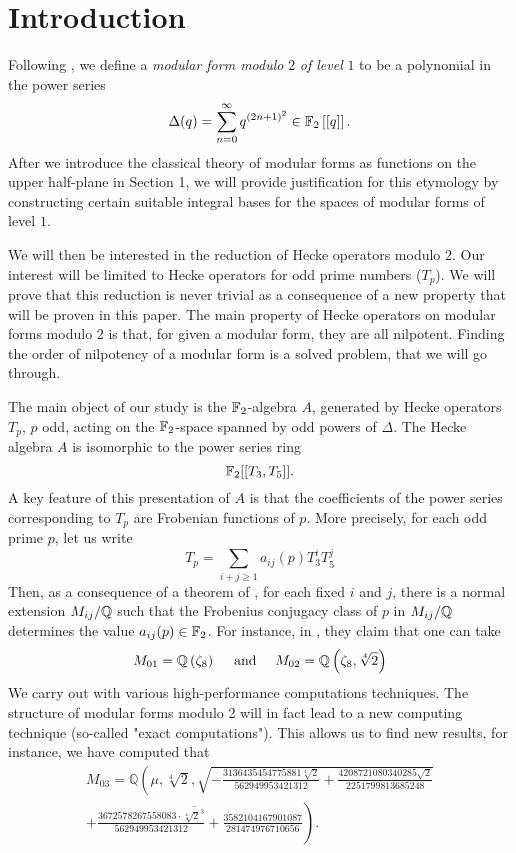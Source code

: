 \setcounter{section}{-1}
\section{Introduction}

Following \cite{OrdreNilpotenceOperateurHecke}, we define a \textit{modular form modulo} $2$ \textit{of level} $1$ to be a polynomial in the power series 
$$
\Delta(q) = \sum_{n = 0}^{\infty}q^{(2n+1)^2} \in \mathbb{F}_2\left[\left[ q \right]\right].
$$
After we introduce the classical theory of modular forms as functions on the upper half-plane in Section 1, we will provide justification for this etymology by constructing certain suitable integral bases for the spaces of modular forms of level $1$.

We will then be interested in the reduction of Hecke operators modulo $2$.
Our interest will be limited to Hecke operators for odd prime numbers ($T_p$).
We will prove that this reduction is never trivial as a consequence of a new property that will be proven in this paper.
The main property of Hecke operators on modular forms modulo $2$ is that, for given a modular form, they are all nilpotent.
Finding the order of nilpotency of a modular form is a solved problem, that we will go through.

The main object of our study is the $\mathbb{F}_2$-algebra $A$, generated by Hecke operators $T_p$, $p$ odd, acting on the $\mathbb{F}_2$-space spanned by odd powers of $\Delta$.
The Hecke algebra $A$ is isomorphic to the power series ring 
$$
\mathbb{F}_2[[T_3, T_5]].
$$
A key feature of this presentation of $A$ is that the coefficients of the power series corresponding to $T_p$ are Frobenian functions of $p$.
More precisely, for each odd prime $p$, let us write 
$$
T_p = \sum_{i+j \geq 1} a_{ij}(p)T_3^iT_5^j
$$
Then, as a consequence of a theorem of \cite{bellaiche}, for each fixed $i$ and $j$, there is a normal extension $M_{ij}/\mathbb{Q}$ such that the Frobenius conjugacy class of $p$ in $M_{ij}/\mathbb{Q}$ determines the value $a_{ij}(p) \in \mathbb{F}_2$.
For instance, in \cite{OrdreNilpotenceOperateurHecke}, they claim that one can take 
$$
M_{01} = \mathbb{Q}\left( \zeta_8 \right)
\quad \text{ and } \quad 
M_{02} = \mathbb{Q}\left( \zeta_8, \sqrt[4]{2} \right)
$$
We carry out with various high-performance computations techniques.
The structure of modular forms modulo 2 will in fact lead to a new computing technique (so-called "exact computations").
This allows us to find new results, for instance, we have computed that
\begin{multline*}
	M_{03} = \mathbb{Q}\left(\mu, \sqrt[4]{2}, \sqrt{
		- \frac{3136435454775881 \sqrt[4]{2}}{562949953421312} 
		+ \frac{4208721080340285 \sqrt{2}}{2251799813685248} 
	}\right. \\
	\left. \overline{ 
		+ \frac{3672578267558083 \cdot \sqrt[4]{2}^3}{562949953421312} 
		+ \frac{3582104167901087}{281474976710656}
	}\right).
\end{multline*}

